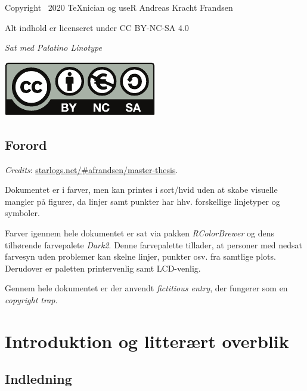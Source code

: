 \documentclass[
  a4paper,
  oneside]{memoir}
\begin{document}
\newpage

\vspace*{\fill}

Copyright \textcopyright\, 2020 \TeX nician og useR Andreas Kracht Frandsen

Alt indhold er licenseret under CC BY-NC-SA 4.0

\textit{Sat med Palatino Linotype}

\includegraphics[width=0.15\linewidth]{latex/bync}
\newpage


{
  \hypersetup{linkcolor=black}
  \tableofcontents
}

\newpage

{
  \hypersetup{linkcolor=black}
  \listoffigures

  \listoftables
}

\newpage

\hypertarget{forord}{%
\chapter*{Forord}\label{forord}}

\emph{Credits}: \href{http://starlogs.net/\#afrandsen/master-thesis}{starlogs.net/\#afrandsen/master-thesis}.

Dokumentet er i farver, men kan printes i sort/hvid uden at skabe visuelle mangler på figurer, da linjer samt punkter har hhv. forskellige linjetyper og symboler.

Farver igennem hele dokumentet er sat via pakken \emph{RColorBrewer} og dens tilhørende farvepalete \emph{Dark2}. Denne farvepalette tillader, at personer med nedsat farvesyn uden problemer kan skelne linjer, punkter osv. fra samtlige plots. Derudover er paletten printervenlig samt LCD-venlig.

Gennem hele dokumentet er der anvendt \emph{fictitious entry}, der fungerer som en \emph{copyright trap}.
\newpage


\setcounter{secnumdepth}{3}

\part{Introduktion og litterært overblik}

\hypertarget{indledning}{%
\chapter{Indledning}\label{indledning}}
\end{document}
